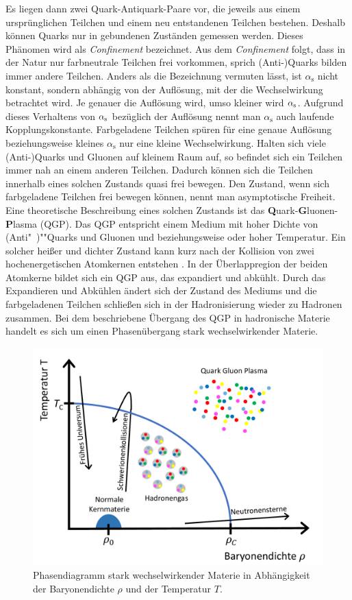 Es liegen dann zwei Quark-Antiquark-Paare vor, die jeweils aus einem ursprünglichen Teilchen und einem neu entstandenen Teilchen bestehen.
Deshalb können Quarks nur in gebundenen Zuständen gemessen werden.
Dieses Phänomen wird als \textit{Con\-fine\-ment} bezeichnet.
Aus dem \textit{Confinement} folgt, dass in der Natur nur farbneutrale Teilchen frei vorkommen, sprich (Anti-)Quarks bilden immer andere Teilchen.%
\newline
Anders als die Bezeichnung vermuten lässt, ist $\alpha_\text{s}$ nicht konstant, sondern abhängig von der Auf\-lö\-sung, mit der die Wechselwirkung betrachtet wird.
Je genauer die Auflösung wird, umso kleiner wird $\alpha_{\rm{s}}$.
Aufgrund dieses Verhaltens von $\alpha_{\rm{s}}$ bezüglich der Auflösung nennt man $\alpha_\text{s}$ auch laufende Kopplungskonstante.
Farbgeladene Teilchen spüren für eine genaue Auflösung beziehungsweise kleines $\alpha_\text{s}$ nur eine kleine Wechselwirkung.
\newline
Halten sich viele (Anti-)Quarks und Gluonen auf kleinem Raum auf, so befindet sich ein Teilchen immer nah an einem anderen Teilchen.
Dadurch können sich die Teilchen innerhalb eines solchen Zustands quasi frei bewegen.
Den Zustand, wenn sich farbgeladene Teilchen frei bewegen können, nennt man asymptotische Freiheit.
Eine theoretische Beschreibung eines solchen Zustands ist das  \textbf{Q}uark-\textbf{G}luonen-\textbf{P}lasma (QGP).
Das QGP entspricht einem Medium mit hoher Dichte von (Anti"~)""Quarks und Gluonen und be\-zie\-hungs\-wei\-se oder hoher Temperatur.
\newline
Ein solcher heißer und dichter Zustand kann kurz nach der Kollision von zwei hochenergetischen Atomkernen entstehen \cite{Karsch:2006xs}.
In der Überlappregion der beiden Atomkerne bildet sich ein QGP aus, das expandiert und abkühlt.
Durch das Expandieren und Abkühlen ändert sich der Zustand des Mediums und die farbgeladenen Teilchen schließen sich in der  Hadronisierung wieder zu Hadronen zusammen.
Bei dem beschriebene Übergang des QGP in hadronische Materie handelt es sich um einen Phasenübergang stark wechselwirkender Materie.
\begin{figure}[tp]
\centering
\includegraphics[width=.6\linewidth]{QCD_phase_diagram.pdf}
\caption{Phasendiagramm stark wechselwirkender Materie in Abhängigkeit der Baryonendichte $\rho$ und der Temperatur $T$.
\cite{Thesis:Tim}}
\label{fig:QGPPhase}
\end{figure}
